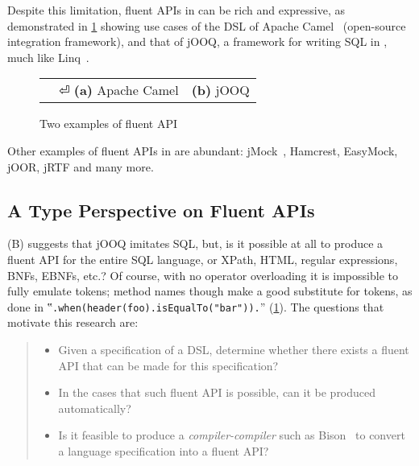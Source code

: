 \documentclass[a4paper,USenglish]{lipics-v2016}
\begin{document}
Despite this limitation, fluent APIs in \Java can be rich and expressive, as demonstrated
  in \cref{figure:DSL} showing use cases of the DSL of Apache Camel~\cite{Ibsen:Anstey:10}
(open-source integration framework),
and that of jOOQ, a framework for writing
  SQL in \Java, much like Linq~\cite{Meijer:Beckman:Bierman:06}.

\begin{figure}[H]
  \caption{\label{figure:DSL} Two examples of \Java fluent API}
  \begin{tabular}{@{}c@{}c@{}}
    \parbox[c]{44ex}{} &
    \hspace{-3ex} \parbox[c]{59ex}{}⏎
    \textbf{(a)} Apache Camel & \textbf{(b)} jOOQ
  \end{tabular}
\end{figure}

Other examples of fluent APIs in \Java are abundant:
  jMock~\cite{Freeman:Pryce:06},
  Hamcrest,
  EasyMock,
  jOOR,
  jRTF
  and many more.

\subsection{A Type Perspective on Fluent APIs}
(B) suggests that jOOQ imitates SQL,
but, is it possible at all to produce a fluent API
for the entire SQL language,
or XPath, HTML, regular expressions, BNFs, EBNFs, etc.?
Of course, with no operator overloading it is impossible
to fully emulate tokens; method names though make a good substitute for tokens, as done
in ‟\lstinline{.when(header(foo).isEqualTo("bar")).}” (\cref{figure:DSL}).
The questions that motivate this research are:
\begin{quote}
  \begin{itemize}
    \item Given a specification of a DSL, determine whether there exists
        a fluent API that can be made for this specification?
    \item In the cases that such fluent API is possible,
      can it be produced automatically?
    \item Is it feasible to produce a \emph{compiler-compiler} such as Bison~\cite{Bison:manual}
        to convert a language specification into a fluent API?
\end{itemize}
\end{quote}
\end{document}
